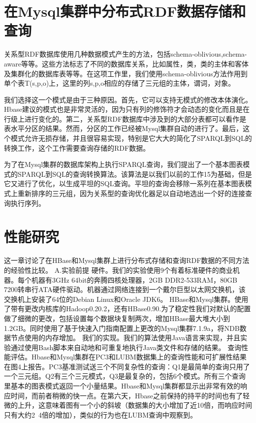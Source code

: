 \section*{在Mysql集群中分布式RDF数据存储和查询}
关系型RDF数据库使用几种数据模式产生的方法，包括schema-oblivious,schema-aware等等。这些方法标志了不同的数据库关系，比如属性，类，类的主体和客体及集群化的数据库表等等。在这项工作里，我们使用schema-oblivious方法作用到单个表T(s,p,o)上，这里的列s,p,o相应的存储了三元组的主体，谓词，对象。

  我们选择这一个模式是由于三种原因。首先，它可以支持无模式的修改本体演化。Hbase建议的模式也是非常灵活的，因为只有列的修饰符才会动态的变化而且是在行级上进行变化的。第二，关系型RDF数据库中涉及到的大部分表都可以看作是表水平分区的结果。然而，分区的工作已经被Mysql集群自动的进行了。最后，这个模式允许无损存储，并且很容易实现，特别是它大大的简化了SPARQL到SQL的转换工作，这个工作需要查询存储的RDF数据。

  为了在Mysql集群的数据库架构上执行SPARQL查询，我们提出了一个基本图表模式的SPARQL到SQL的查询转换算法。该算法是以我们以前的工作15为基础，但是它又进行了优化，以生成平坦的SQL查询。平坦的查询会移除一系列在基本图表模式上重新排序的三元组，因为关系型的查询优化器足以自动地选出一个好的连接查询执行序列。

\section*{性能研究}
这一章讨论了在HBase和Mysql集群上进行分布式存储和查询RDF数据的不同方法的经验性比较。
A.实验前提
硬件。我们的实验使用9个有着标准硬件的商业机器。每个机器有3GHz 64bit的奔腾四核处理器，2GB DDR2-533RAM，80GB 7200转串行ATA硬件驱动。机器通过网络连接到一个戴尔巨型以太网交换机，该交换机上安装了64位的Debian Linux和Oracle JDK6。
HBase和Mysql集群。使用了带有更改内核库的Hadoop0.20.2，还有HBase0.90.为了稳定性我们对默认的配置做了细微的更改，包括设置每个数据块复制两次，增加HBase最大堆大小到1.2GB。同时使用了基于快速入门指南配置上更改的Mysql集群7.1.9a，将NDB数据节点使用的内存增加。
我们的实现。我们的算法使用Java语言来实现，并且实验通过使用Bash脚本来自动地和可重复地执行Java类文件和存储的结果。
查询性能评估。Hbase和Mysql集群在PC3和LUBM数据集上的查询性能和可扩展性结果在图4上报告。PC3基准测试送三个不同复杂性的查询：Q1是最简单的查询只用了一个三元组。Q2有三个三元模式，Q3是最复杂的，包括6个模式。所有三个查询里基本的图表模式返回一个小量结果。Hbase和Mysql集群都显示出非常有效的响应时间，而前者稍微的快一点。在第六天，Hbase之前保持的持平的时间也有了轻微的上升，这意味着图有一个小的斜坡（数据集的大小增加了近10倍，而响应时间只有大约2~4倍的增加），类似的行为也在LUBM查询中观察到。

